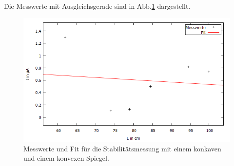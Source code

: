 Die Messwerte mit Ausgleichsgerade sind in Abb.\ref{dumm} dargestellt.
\begin{figure}[H]
  \centering
  \includegraphics[width=14cm]{bilder/konkavplanar.png}
  \caption{Messwerte und Fit für die Stabilitätsmessung mit einem konkaven und einem konvexen Spiegel.}
  \label{dumm}
\end{figure}
